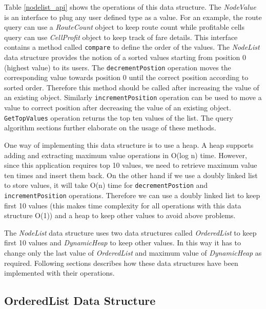 Table \ref{nodelist_api} shows the operations of this data structure. The \textit{NodeValue} is an interface to plug any user defined type as a value. For an example, the route query can use a \textit{RouteCount} object to keep route count while profitable cells query can use \textit{CellProfit} object to keep track of fare details. This interface contains a method called \texttt{compare} to define the order of the values. The \textit{NodeList} data structure provides the notion of a sorted values starting from position 0 (highest value) to its users. The \texttt{decrementPostion} operation moves the corresponding value towards position 0 until the correct position according to sorted order. Therefore this method should be called after increasing the value of an existing object. Similarly \texttt{incrementPosition} operation can be used to move a value to correct position after decreasing the value of an existing object. \texttt{GetTopValues} operation returns the top ten values of the list. The query algorithm sections further elaborate on the usage of these methods.

One way of implementing this data structure is to use a heap. A heap supports adding and extracting maximum value operations in O(log n) time. However, since this application requires top 10 values, we need to retrieve maximum value ten times and insert them back. On the other hand if we use a doubly linked list to store values, it will take O(n) time for  \texttt{decrementPostion} and \texttt{incrementPosition} operations. Therefore we can use a doubly linked list to keep first 10 values (this makes time complexity for all operations with this data structure O(1)) and a heap to keep other values to avoid above problems.  

The \textit{NodeList} data structure uses two data structures called \textit{OrderedList} to keep first 10 values and \textit{DynamicHeap} to keep other values. In this way it has to change only the last value of \textit{OrderedList} and maximum value of \textit{DynamicHeap} as required. Following sections describes how these data structures have been implemented with their operations.

\subsection{OrderedList Data Structure}

